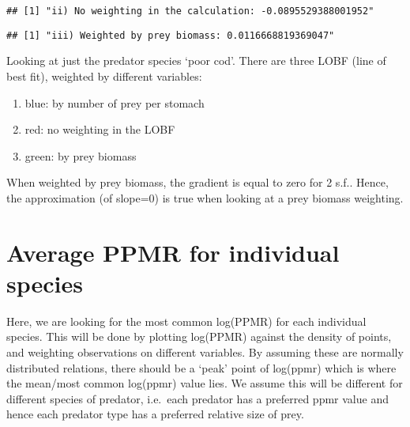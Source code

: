 \documentclass[
]{article}
\newenvironment{Shaded}{\begin{snugshade}}{\end{snugshade}}
\newcommand{\AttributeTok}[1]{\textcolor[rgb]{0.77,0.63,0.00}{#1}}
\newcommand{\CommentTok}[1]{\textcolor[rgb]{0.56,0.35,0.01}{\textit{#1}}}
\newcommand{\DecValTok}[1]{\textcolor[rgb]{0.00,0.00,0.81}{#1}}
\newcommand{\FunctionTok}[1]{\textcolor[rgb]{0.00,0.00,0.00}{#1}}
\newcommand{\NormalTok}[1]{#1}
\newcommand{\OtherTok}[1]{\textcolor[rgb]{0.56,0.35,0.01}{#1}}
\newcommand{\SpecialCharTok}[1]{\textcolor[rgb]{0.00,0.00,0.00}{#1}}
\newcommand{\StringTok}[1]{\textcolor[rgb]{0.31,0.60,0.02}{#1}}
\providecommand{\tightlist}{%
  \setlength{\itemsep}{0pt}\setlength{\parskip}{0pt}}
\begin{document}
\begin{verbatim}
## [1] "ii) No weighting in the calculation: -0.0895529388001952"
\end{verbatim}

\begin{Shaded}
\end{Shaded}

\begin{verbatim}
## [1] "iii) Weighted by prey biomass: 0.0116668819369047"
\end{verbatim}

Looking at just the predator species `poor cod'. There are three LOBF
(line of best fit), weighted by different variables:

\begin{enumerate}
\def\labelenumi{\arabic{enumi}.}
\tightlist
\item
  blue: by number of prey per stomach
\item
  red: no weighting in the LOBF
\item
  green: by prey biomass
\end{enumerate}

When weighted by prey biomass, the gradient is equal to zero for 2 s.f..
Hence, the approximation (of slope=0) is true when looking at a prey
biomass weighting.

\hypertarget{average-ppmr-for-individual-species}{%
\section{Average PPMR for individual
species}\label{average-ppmr-for-individual-species}}

Here, we are looking for the most common log(PPMR) for each individual
species. This will be done by plotting log(PPMR) against the density of
points, and weighting observations on different variables. By assuming
these are normally distributed relations, there should be a `peak' point
of log(ppmr) which is where the mean/most common log(ppmr) value lies.
We assume this will be different for different species of predator,
i.e.~each predator has a preferred ppmr value and hence each predator
type has a preferred relative size of prey.
\end{document}
